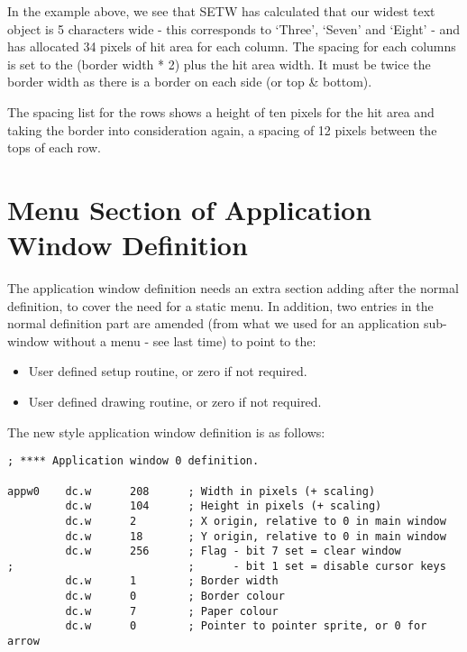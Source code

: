 In the example above, we see that SETW has calculated that our
    widest text object is 5 characters wide -{} this corresponds to `Three',
    `Seven' and `Eight' -{} and has allocated 34 pixels of hit area for each
    column. The spacing for each columns is set to the (border width * 2) plus
    the hit area width. It must be twice the border width as there is a border
    on each side (or top \& bottom).

The spacing list for the rows shows a height of ten pixels for the
    hit area and taking the border into consideration again, a spacing of 12
    pixels between the tops of each row.

\section{Menu Section of Application Window Definition}
\label{ch29-app-menu-win-def}%

The application window definition needs an extra section adding
    after the normal definition, to cover the need for a static menu. In
    addition, two entries in the normal definition part are amended (from what
    we used for an application sub-{}window without a menu -{} see last time) to
    point to the:
\begin{itemize}[itemsep=0pt]

\item{}User defined setup routine, or zero if not required.


\item{}User defined drawing routine, or zero if not required.

\end{itemize}

The new style application window definition is as follows:

\begin{lstlisting}[firstnumber=1,caption={AppMenuTest1Win\_asm - Application Window Definition}]
; **** Application window 0 definition.

appw0    dc.w      208      ; Width in pixels (+ scaling)
         dc.w      104      ; Height in pixels (+ scaling)
         dc.w      2        ; X origin, relative to 0 in main window
         dc.w      18       ; Y origin, relative to 0 in main window
         dc.w      256      ; Flag - bit 7 set = clear window
;                           ;      - bit 1 set = disable cursor keys
         dc.w      1        ; Border width
         dc.w      0        ; Border colour
         dc.w      7        ; Paper colour
         dc.w      0        ; Pointer to pointer sprite, or 0 for arrow
\end{lstlisting}

